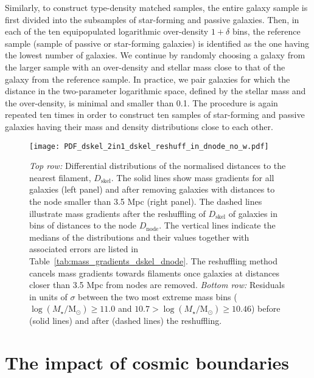 \documentclass[useAMS,usenatbib]{mnras}
\newcommand{\Mstardot}{M\ensuremath{_{\star}} / \mathrm{M}\ensuremath{_{\odot}}}
\begin{document}
Similarly, to construct type-density matched samples, the entire galaxy sample is first divided into the subsamples of star-forming and passive galaxies. Then, in each of the ten equipopulated logarithmic over-density $1+\delta$ bins, the reference sample (sample of passive or star-forming galaxies) is identified as the one having the lowest number of galaxies. We continue by randomly choosing a galaxy from the larger sample with an over-density and stellar mass close to that of the galaxy from the reference sample. In practice, we pair galaxies for which the distance in the two-parameter logarithmic space, defined by the stellar mass and the over-density, is minimal and smaller than 0.1. The procedure is again repeated ten times in order to construct ten samples of star-forming and passive galaxies having their mass and density distributions close to each other. 


\begin{figure*}
\texttt{[image: PDF\_dskel\_2in1\_dskel\_reshuff\_in\_dnode\_no\_w.pdf]}
\caption{\textit{Top row:} Differential distributions of the normalised distances to the nearest filament, $D_{\mathrm{skel}}$. 
The solid lines show mass gradients for all galaxies (left panel) and after removing galaxies with distances to the node smaller than 3.5 Mpc (right panel). The dashed lines illustrate mass gradients after the reshuffling of $D_{\mathrm{skel}}$ of galaxies in bins of distances to the node $D_{\mathrm{node}}$. The vertical lines indicate the medians of the distributions and their values together with associated errors are listed in Table~\ref{tab:mass_gradients_dskel_dnode}. 
The reshuffling method cancels mass gradients towards filaments once galaxies at distances closer than 3.5 Mpc from nodes are removed. 
\textit{Bottom row:} Residuals in units of $\sigma$ between the two most extreme mass bins ($\log(\Mstardot) \geq 11.0$ and $10.7 > \log (\Mstardot) \geq 10.46$) before (solid lines) and after (dashed lines) the reshuffling.}
\label{Fig:appendix_dskel_dnode}
\end{figure*}


\section{The impact of cosmic boundaries} 
\label{sec:appendix_boundaries}
\end{document}
